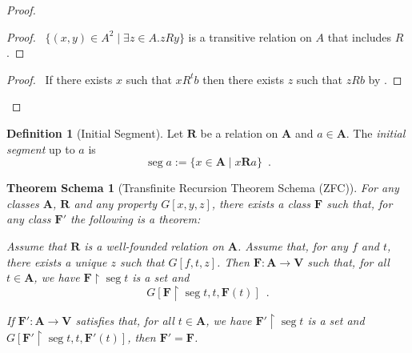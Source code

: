 \documentclass{book}
\let\qed\relax
\newtheorem{thms}[ax]{Theorem Schema}
\theoremstyle{definition}
\newtheorem{df}[ax]{Definition}
\newcommand{\seg}{\ensuremath{\operatorname{seg}}}
\begin{document}
\begin{proof}
\pf
{}
\begin{proof}
	\pf\ $\{ (x,y) \in A^2 \mid \exists z \in A. zRy \}$ is a transitive relation on $A$ that includes $R$.
\end{proof}
\begin{proof}
	\pf\ If there exists $x$ such that $x R^t b$ then there exists $z$ such that $z R b$ by .
\end{proof}
\qed
\end{proof}

\begin{df}[Initial Segment]
Let $\mathbf{R}$ be a relation on $\mathbf{A}$ and $a \in \mathbf{A}$. The \emph{initial segment} up to $a$ is
\[ \seg a := \{ x \in \mathbf{A} \mid x \mathbf{R} a \} \enspace . \]
\end{df}

\begin{thms}[Transfinite Recursion Theorem Schema (ZFC)]
For any classes $\mathbf{A}$, $\mathbf{R}$ and any property $G[x,y,z]$, there exists a class $\mathbf{F}$ such that, for any class $\mathbf{F}'$ the following is a theorem:

Assume that $\mathbf{R}$ is a well-founded relation on $\mathbf{A}$. Assume that, for any $f$ and $t$, there exists a unique $z$ such that $G[f,t,z]$. Then $\mathbf{F} : \mathbf{A} \rightarrow \mathbf{V}$ such that, for all $t \in \mathbf{A}$, we have $\mathbf{F} \restriction \seg t$ is a set and
\[ G[\mathbf{F} \restriction \seg t, t, \mathbf{F}(t)] \enspace . \]

If $\mathbf{F}' : \mathbf{A} \rightarrow \mathbf{V}$ satisfies that, for all $t \in \mathbf{A}$, we have $\mathbf{F}' \restriction \seg t$ is a set and $G[\mathbf{F}' \restriction \seg t, t, \mathbf{F}'(t)]$, then $\mathbf{F}' = \mathbf{F}$.
\end{thms}
\end{document}
